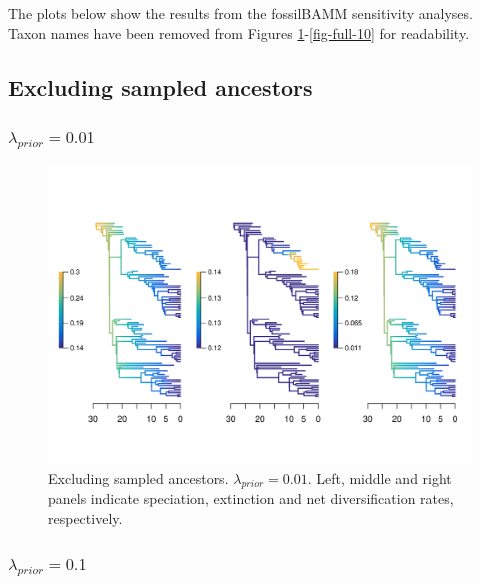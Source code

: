 \documentclass[a4paper, 12pt]{article}
\begin{document}
The plots below show the results from the fossilBAMM sensitivity analyses. 
Taxon names have been removed from Figures \ref{fig-noanc-0-01}-\ref{fig-full-10} for readability.

\subsection{Excluding sampled ancestors}

\subsubsection{$\lambda_{prior} = 0.01$}

\begin{figure}[H]
  \centering
  \includegraphics[width = \linewidth]{figures/diversification/sensitivity-analyses/shifts-0-01/sensitivity-analysis-noanc-0-01.png}
  \caption{Excluding sampled ancestors. $\lambda_{prior} = 0.01$. Left, middle and right panels indicate speciation, extinction and net diversification rates, respectively.}
  \label{fig-noanc-0-01}
\end{figure}

\subsubsection{$\lambda_{prior} = 0.1$}
\end{document}

